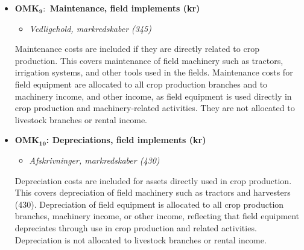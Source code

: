 \documentclass[12pt]{article}
\begin{document}
\begin{itemize}
   This approach deviates from the SEGES framework, where the farmer’s income is calculated as a residual based on norm hours (\textit{Personlig indtjening (7960)}). 
   Instead, by imposing a fixed salary, labor costs become exogenous to farm size, allowing differences in costs to reflect scale and efficiency rather than being absorbed through a norm-based labor adjustment.
   
   Potential issues: The arbitrary threshold between full-time and part-time means that farms with norm hours near the cutoff are treated very differently, even if their actual labor requirements are almost identical. 
   In addition, this approach breaks the direct link between labor input (norm hours) and remuneration, which may lead to inconsistencies if farms with very different labor requirements are assigned identical owner salaries. 
   In addition this approach excludes any spouse or family labor.
   
   \item[] \textbf{OMK$_\textbf{9}:$ Maintenance, field implements (kr)}
   \begin{itemize}
       \item[$+$] \textit{Vedligehold, markredskaber (345)}
   \end{itemize}
   Maintenance costs are included if they are directly related to crop production. 
   This covers maintenance of field machinery such as tractors, irrigation systems, and other tools used in the fields.
   Maintenance costs for field equipment are allocated to all crop production branches and to machinery income, and other income, as field equipment is used directly in crop production and machinery-related activities. They are not allocated to livestock branches or rental income.

    \item[] \textbf{OMK$_\textbf{10}$: Depreciations, field implements (kr)}
    \begin{itemize}
        \item[$+$] \textit{Afskrivninger, markredskaber (430)}
    \end{itemize}
    Depreciation costs are included for assets directly used in crop production. This covers depreciation of field machinery such as tractors and harvesters (430).
    Depreciation of field equipment is allocated to all crop production branches, machinery income, or other income, reflecting that field equipment depreciates through use in crop production and related activities. 
    Depreciation is not allocated to livestock branches or rental income.
\end{itemize}
\end{document}
